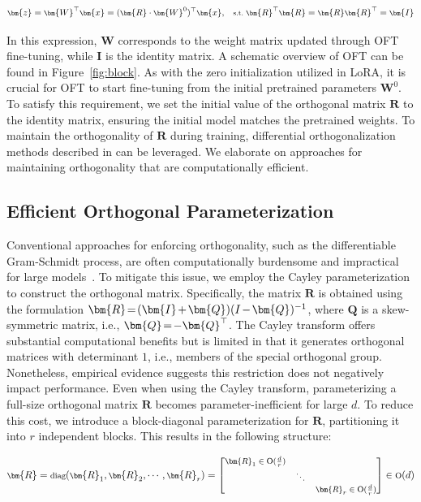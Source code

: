 \begin{equation}\label{eq:oft_general}
    \footnotesize
    \bm{z}=\bm{W}^\top\bm{x}=(\bm{R}\cdot\bm{W}^0)^\top\bm{x},~~~\text{s.t.}~\bm{R}^\top\bm{R}=\bm{R}\bm{R}^\top=\bm{I}
\end{equation}

In this expression, $\bm{W}$ corresponds to the weight matrix updated through OFT fine-tuning, while $\bm{I}$ is the identity matrix. A schematic overview of OFT can be found in Figure~\ref{fig:block}. As with the zero initialization utilized in LoRA, it is crucial for OFT to start fine-tuning from the initial pretrained parameters $\bm{W}^0$. To satisfy this requirement, we set the initial value of the orthogonal matrix $\bm{R}$ to the identity matrix, ensuring the initial model matches the pretrained weights. To maintain the orthogonality of $\bm{R}$ during training, differential orthogonalization methods described in \cite{liu2021orthogonal,lezcano2019cheap} can be leveraged. We elaborate on approaches for maintaining orthogonality that are computationally efficient.

\subsection{Efficient Orthogonal Parameterization}\label{sect:eff_ortho}

Conventional approaches for enforcing orthogonality, such as the differentiable Gram-Schmidt process, are often computationally burdensome and impractical for large models~\cite{liu2021orthogonal}. To mitigate this issue, we employ the Cayley parameterization to construct the orthogonal matrix. Specifically, the matrix $\bm{R}$ is obtained using the formulation $\thickmuskip=2mu \medmuskip=2mu \bm{R}=(\bm{I}+\bm{Q})(I-\bm{Q})^{-1}$, where $\bm{Q}$ is a skew-symmetric matrix, i.e., $\thickmuskip=2mu \medmuskip=2mu \bm{Q}=-\bm{Q}^\top$. The Cayley transform offers substantial computational benefits but is limited in that it generates orthogonal matrices with determinant $1$, i.e., members of the special orthogonal group. Nonetheless, empirical evidence suggests this restriction does not negatively impact performance. Even when using the Cayley transform, parameterizing a full-size orthogonal matrix $\bm{R}$ becomes parameter-inefficient for large $d$. To reduce this cost, we introduce a block-diagonal parameterization for $\bm{R}$, partitioning it into $r$ independent blocks. This results in the following structure:

\begin{equation}
    \footnotesize
    \bm{R}=\text{diag}(\bm{R}_1,\bm{R}_2,\cdots,\bm{R}_r)=\begin{bmatrix}
    \bm{R}_1\in \text{O}(\frac{d}{r}) &  &\\
    &\ddots & \\
    & & \bm{R}_r\in \text{O}(\frac{d}{r})
    \end{bmatrix}\in \text{O}(d)
\end{equation}

